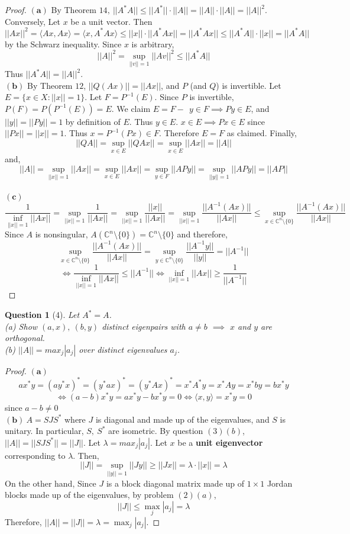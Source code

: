 \documentclass[11pt]{article}
\theoremstyle{quest}
\newtheorem*{question}{Question}
\begin{document}
\begin{proof}
$\mathbf{(a)}$ By Theorem $14,\ ||A^*A|| \le ||A^*|| \cdot ||A|| = ||A|| \cdot ||A|| = ||A||^2$.
Conversely, Let $x$ be a unit vector. Then 
$$||Ax||^2 = \langle Ax, Ax \rangle = \langle x, A^*Ax \rangle \le ||x|| \cdot ||A^*Ax|| = ||A^*Ax|| \le ||A^*A|| \cdot ||x|| = ||A^*A||$$
by the Schwarz inequality. Since $x$ is arbitrary,
$$||A||^2 = \sup_{||v||=1} ||Av||^2 \le ||A^*A||$$
Thus $||A^*A|| = ||A||^2$.
\\$\mathbf{(b)}$ By Theorem $12$, $||Q(Ax)|| = ||Ax||$, and $P$ (and $Q$) is invertible. Let $E = \{ x \in X : ||x|| = 1 \}$. Let $F = P^{-1}(E)$. Since $P$ is invertible, $P(F) = P(P^{-1}(E)) = E$. We claim $E = F-\ \ y \in F \implies Py \in E$, and $||y|| = ||Py|| = 1$ by definition of $E$. Thus $y \in E$. $x \in E \implies Px \in E$ since $||Px|| = ||x|| = 1$. Thus $x = P^{-1}(Px) \in F$. Therefore $E = F$ as claimed. Finally,
$$||QA|| = \sup_{x \in E} ||QAx|| = \sup_{x \in E} ||Ax|| = ||A||$$
and,
$$||A|| = \sup_{||x|| = 1}||Ax|| = \sup_{x \in E}||Ax|| = \sup_{y \in F}||APy|| = \sup_{||y|| = 1}||APy|| = ||AP||$$
\\$\mathbf{(c)}$ $$\dfrac{1}{\inf_{||x||=1} ||Ax||} = \sup_{||x||=1} \dfrac{1}{||Ax||} = \sup_{||x||=1} \dfrac{||x||}{||Ax||} = \sup_{||x||=1} \dfrac{||A^{-1}(Ax)||}{||Ax||} \le \sup_{x \in \mathbb{C}^n \setminus \{0\}} \dfrac{||A^{-1}(Ax)||}{||Ax||}$$
Since $A$ is nonsingular, $A(\mathbb{C}^n \setminus \{0\}) = \mathbb{C}^n \setminus \{0\}$ and therefore,
$$\sup_{x \in \mathbb{C}^n \setminus \{0\}} \dfrac{||A^{-1}(Ax)||}{||Ax||} = \sup_{y \in \mathbb{C}^n \setminus \{0\}} \dfrac{||A^{-1}y||}{||y||} = ||A^{-1}||$$
$$\iff \dfrac{1}{\inf_{||x||=1} ||Ax||} \le ||A^{-1}|| \iff \inf_{||x||=1} ||Ax|| \ge \dfrac{1}{||A^{-1}||}$$
\end{proof}
\begin{question}[4]
Let $A^* = A$.
\\(a) Show $(a,x),\ (b, y)$ distinct eigenpairs with $a \ne b$ $\implies $ $x$ and $y$ are orthogonal.
\\(b) $||A|| = max_j |a_j|$ over distinct eigenvalues $a_j$.
\end{question}
\begin{proof}$\mathbf{(a)}$ $$ax^*y = (ay^*x)^* = (y^*ax)^* = (y^*Ax)^* = x^*A^*y = x^*Ay = x^*by = bx^*y$$
$$\iff (a-b)x^*y = ax^*y - bx^*y = 0 \iff \langle x, y \rangle = x^*y = 0$$
since $a-b \ne 0$
\\$\mathbf{(b)}\ A = SJS^*$ where $J$ is diagonal and made up of the eigenvalues, and $S$ is unitary. In particular, $S,\ S^*$ are isometric. By question $(3)(b)$, $||A|| = ||SJS^*|| = ||J||$. Let $\lambda = max_j |a_j|$. Let $x$ be a \textbf{unit eigenvector} corresponding to $\lambda$. Then,
$$||J|| = \sup_{||y||=1}||Jy|| \ge ||Jx|| = \lambda \cdot ||x||  = \lambda$$
On the other hand, Since $J$ is a block diagonal matrix made up of $1 \times 1$ Jordan blocks made up of the eigenvalues, by problem $(2)(a)$,
$$||J|| \le \max_j|a_j| = \lambda$$
Therefore, $||A|| = ||J|| = \lambda = \max_j|a_j|$.
\end{proof}
\end{document}
